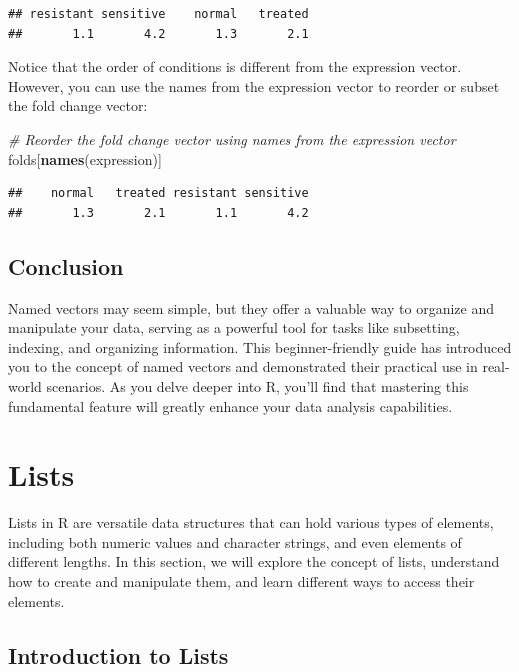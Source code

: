 \documentclass[
]{book}
\newenvironment{Shaded}{\begin{snugshade}}{\end{snugshade}}
\newcommand{\CommentTok}[1]{\textcolor[rgb]{0.56,0.35,0.01}{\textit{#1}}}
\newcommand{\FunctionTok}[1]{\textcolor[rgb]{0.13,0.29,0.53}{\textbf{#1}}}
\newcommand{\NormalTok}[1]{#1}
\begin{document}
\begin{verbatim}
## resistant sensitive    normal   treated 
##       1.1       4.2       1.3       2.1
\end{verbatim}

Notice that the order of conditions is different from the expression vector. However, you can use the names from the expression vector to reorder or subset the fold change vector:

\begin{Shaded}
\begin{Highlighting}[]
\CommentTok{\# Reorder the fold change vector using names from the expression vector}
\NormalTok{folds[}\FunctionTok{names}\NormalTok{(expression)]}
\end{Highlighting}
\end{Shaded}

\begin{verbatim}
##    normal   treated resistant sensitive 
##       1.3       2.1       1.1       4.2
\end{verbatim}

\hypertarget{conclusion-15}{%
\subsection{Conclusion}\label{conclusion-15}}

Named vectors may seem simple, but they offer a valuable way to organize and manipulate your data, serving as a powerful tool for tasks like subsetting, indexing, and organizing information. This beginner-friendly guide has introduced you to the concept of named vectors and demonstrated their practical use in real-world scenarios. As you delve deeper into R, you'll find that mastering this fundamental feature will greatly enhance your data analysis capabilities.

\hypertarget{lists}{%
\section{Lists}\label{lists}}

Lists in R are versatile data structures that can hold various types of elements, including both numeric values and character strings, and even elements of different lengths. In this section, we will explore the concept of lists, understand how to create and manipulate them, and learn different ways to access their elements.

\hypertarget{introduction-to-lists}{%
\subsection{Introduction to Lists}\label{introduction-to-lists}}
\end{document}
